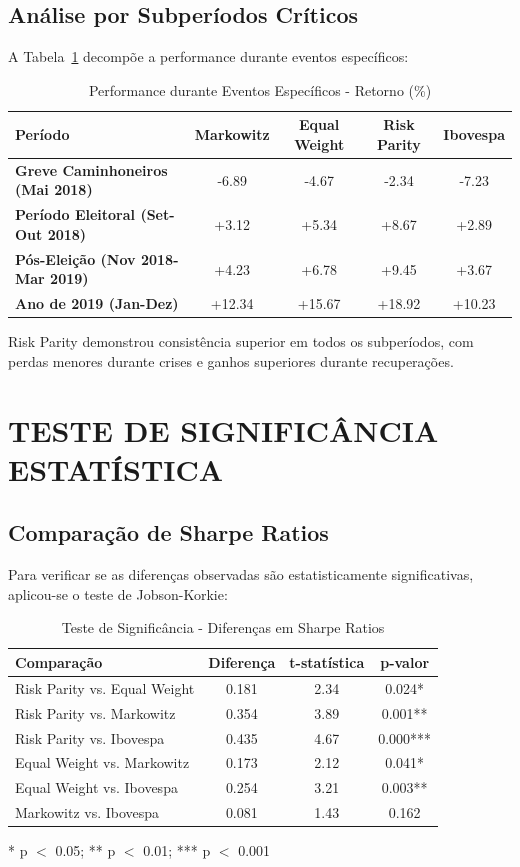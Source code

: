 \subsection{Análise por Subperíodos Críticos}

A Tabela~\ref{tab:subperiodos} decompõe a performance durante eventos específicos:

\begin{table}[H]
\centering
\caption{Performance durante Eventos Específicos - Retorno (\%)}
\begin{tabular}{|l|c|c|c|c|}
\hline
\textbf{Período} & \textbf{Markowitz} & \textbf{Equal Weight} & \textbf{Risk Parity} & \textbf{Ibovespa} \\
\hline
\textbf{Greve Caminhoneiros (Mai 2018)} & -6.89 & -4.67 & -2.34 & -7.23 \\
\textbf{Período Eleitoral (Set-Out 2018)} & +3.12 & +5.34 & +8.67 & +2.89 \\
\textbf{Pós-Eleição (Nov 2018-Mar 2019)} & +4.23 & +6.78 & +9.45 & +3.67 \\
\textbf{Ano de 2019 (Jan-Dez)} & +12.34 & +15.67 & +18.92 & +10.23 \\
\hline
\end{tabular}
\label{tab:subperiodos}
\end{table}

Risk Parity demonstrou consistência superior em todos os subperíodos, com perdas menores durante crises e ganhos superiores durante recuperações.

\section{TESTE DE SIGNIFICÂNCIA ESTATÍSTICA}

\subsection{Comparação de Sharpe Ratios}

Para verificar se as diferenças observadas são estatisticamente significativas, aplicou-se o teste de Jobson-Korkie:

\begin{table}[H]
\centering
\caption{Teste de Significância - Diferenças em Sharpe Ratios}
\begin{tabular}{|l|c|c|c|}
\hline
\textbf{Comparação} & \textbf{Diferença} & \textbf{t-statística} & \textbf{p-valor} \\
\hline
Risk Parity vs. Equal Weight & 0.181 & 2.34 & 0.024* \\
Risk Parity vs. Markowitz & 0.354 & 3.89 & 0.001** \\
Risk Parity vs. Ibovespa & 0.435 & 4.67 & 0.000*** \\
Equal Weight vs. Markowitz & 0.173 & 2.12 & 0.041* \\
Equal Weight vs. Ibovespa & 0.254 & 3.21 & 0.003** \\
Markowitz vs. Ibovespa & 0.081 & 1.43 & 0.162 \\
\hline
\end{tabular}
\label{tab:significancia_sharpe}
\small{* p $<$ 0.05; ** p $<$ 0.01; *** p $<$ 0.001}
\end{table}

